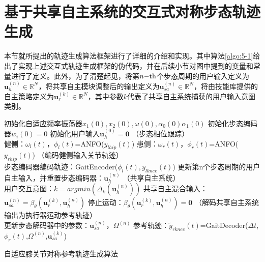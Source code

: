 \section{基于共享自主系统的交互式对称步态轨迹生成}
本节就所提出的轨迹生成算法框架进行了详细的介绍和实现。其中算法\ref{algo:5-1}给出了实现上述交互式轨迹生成框架的伪代码，并在后续小节对图中提到的变量和常量进行了定义。此外，为了清楚起见，将第$n{\rm{ - th}}$个步态周期的用户输入定义为${\pmb{u}}_h^{(n)} \in {\mathbb{R}^N}$，将共享自主模块调整后的输出定义为${\pmb{u}}_{sa}^{(n)} \in {\mathbb{R}^N}$，将由技能库提供的自主策略定义为${\pmb{u}}_r^{(k)} \in {\mathbb{R}^N}$，其中参数$k$代表了共享自主系统捕获的用户输入意图类别。
\begin{algorithm}[h]
  \SetAlgoLined
  初始化自适应频率振荡器$x_1(0),x_2(0),\omega(0),\alpha_0(0)\alpha_1(0)$\;
  初始化步态编码器$w_i(0)=0$\;
  初始化用户输入$\pmb{u}_h^{(0)}=\pmb{0}$\;
  {
    （步态相位跟踪）\\
    健侧：$\omega_l(t)$，$\phi_l(t)$=ANFO($y_{lhip}(t)$) \;
    患侧：$\omega_r(t)$，$\phi_r(t)$=ANFO($y_{rhip}(t)$) \;
    （编码健侧输入关节轨迹）\\
    {
      步态编码器编码轨迹：GaitEncoder($\phi_l(t),y_{lknee}(t)$) \;
    }
    {
      更新第n个步态周期的用户自主输入，并重置步态编码器：$\pmb{u}_h^{(n)}$ 
    }
    （共享自主系统）\\
    {
      {
        用户交互意图：$k=argmin(\Delta_k(\pmb{u}_h^{(n)}))$ \;
        共享自主混合输入：$\pmb{u}_{sa}^{(n)} = \beta_{\theta}(\pmb{u}_r^{(k)}, \pmb{u}_h^{(n)})$\;
      }
    }
    {
      停止运动：$\beta_{\theta}(\pmb{u}_r^{(k)}, \pmb{u}_h^{(n)})=\pmb{0}$
    }
    （解码共享自主系统输出为执行器运动参考轨迹）\\
    {
      更新步态解码器中的参数：$\pmb{u}_{sa}^{(n)}$，$\Omega^{(n)}$\;
    }
    {
      参考轨迹：$\widetilde{y}_{rknee}(t)$=GaitDecoder($\Delta t$, $\phi_r(t)$,$\Omega^{(n)}$,$\pmb{u}_{sa}^{(k)}$) \;
    }
  }
  \caption{自适应膝关节对称参考轨迹生成算法}
  \label{algo:5-1}
\end{algorithm}  

